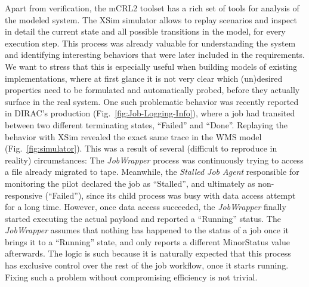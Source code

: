 \documentclass[10pt,conference]{IEEEtran}
\begin{document}
Apart from verification, the mCRL2 toolset has a rich set of tools for analysis of the modeled system. 
The XSim simulator allows to replay scenarios and inspect in 
detail the current state and all possible transitions in the model, for every execution step. 
This process was already valuable for understanding the
system and identifying interesting behaviors that were later included
in the requirements. We want to stress that this is especially useful
when building models of existing implementations, where at first glance it 
is not very clear which (un)desired properties need to be formulated and automatically probed,
before they actually surface in the real system.
One such problematic behavior was recently reported in DIRAC's production (Fig.~\ref{fig:Job-Logging-Info}), where
a job had transited between two different terminating states, ``Failed'' and ``Done''.
Replaying the behavior with XSim revealed the exact same trace in the WMS model (Fig.~\ref{fig:simulator}).
This was a result of several (difficult to reproduce in reality) circumstances:
The \textit{JobWrapper} process was continuously trying to access a file already 
migrated to tape. Meanwhile, the \textit{Stalled Job Agent} responsible for 
monitoring the pilot declared the job as ``Stalled'', and ultimately as non-responsive (``Failed''),
since its child process was busy with data access attempt for a long time.
However, once data access succeeded, the \textit{JobWrapper} finally started executing the 
actual payload and reported a ``Running'' status. 
The \textit{JobWrapper} assumes that nothing has happened to the status of a job once 
it brings it to a ``Running'' state, 
and only reports a different MinorStatus value afterwards.
The logic is such
because it is naturally expected that this process has exclusive control 
over the rest of the job workflow, once it starts running. Fixing such
a problem without compromising efficiency is not trivial.
\end{document}
